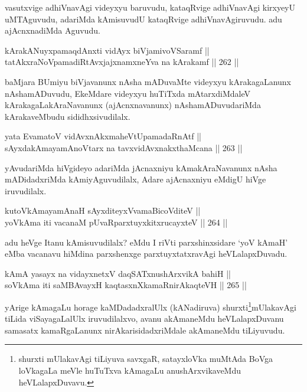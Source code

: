 \begin{artha}
vasutxvige adhiVnavAgi videyxyu baruvudu, kataqRvige adhiVnavAgi
kirxyeyU uMTAguvudu, adariMda kAmisuvudU kataqRvige adhiVnavAgiruvudu.
adu ajAcnxnadiMda Aguvudu.
\end{artha}

\begin{shl}
kArakANuyxpamaqdAnxti vidAyx biVjamivoVSaramf || \\
tatAkxraNoVpamadiRtAvxjajxnamxneYva na kArakamf \hfill || 262 ||  
\end{shl}

\begin{artha}
baMjara BUmiyu biVjavanunx nAsha mADuvaMte videyxyu kArakagaLanunx
nAshamADuvudu, EkeMdare videyxyu huTiTxda mAtarxdiMdaleV
kArakagaLakAraNavanunx (ajAcnxnavanunx) nAshamADuvudariMda
kArakaveMbudu sididhxsivudilalx.
\end{artha}

\begin{shl}
yata EvamatoV vidAvxnAkxmaheVtUpamadaRnAtf || \\
sAyxdakAmayamAnoV\s tarx na tavxvidAvxnakxthaMcana \hfill || 263 ||  
\end{shl}

\begin{artha}
yAvudariMda hiVgideyo adariMda jAcnaxniyu kAmakAraNavanunx nAsha mADidadxriMda kAmiyAguvudilalx, Adare ajAcnaxniyu eMdigU hiVge iruvudilalx.
\end{artha}

\begin{shl}
kutoV\s kAmayamAnaH sAyxditeyxVvamaBicoVditeV || \\
yoV\s kAma iti vacanaM pUvaRparxtuyxkitxrucayxteV \hfill || 264 ||  
\end{shl}

\begin{artha}
adu heVge Itanu kAmisuvudilalx? eMdu I riVti parxshinxsidare `yoV\s
kAmaH' eMba vacanavu hiMdina parxshenxge parxtuyxtatxravAgi heVLalapxDuvadu.
\end{artha}


\begin{shl}
kAmA yasayx na vidayxnetxV daqSATxnushArxvikA bahiH || \\
soV\s kAma iti saMBAvayxH kaqtasxnXkamaRnirAkaqteVH \hfill || 265 ||   
\end{shl}

\begin{artha}
yArige kAmagaLu horage kaMDadadxralUlx (kANadiruva) shurxti\footnote{shurxti mUlakavAgi tiLiyuva savxgaR, satayxloVka muMtAda
BoVga loVkagaLa meVle huTuTxva kAmagaLu anushArxvikaveMdu
heVLalapxDuvavu.}mUlakavAgi tiLida viSayagaLalUlx iruvudilalxvo, avanu akAmaneMdu
heVLalapxDuvanu samasatx kamaRgaLanunx nirAkarisidadxriMdale
akAmaneMdu tiLiyuvudu.
\end{artha}


